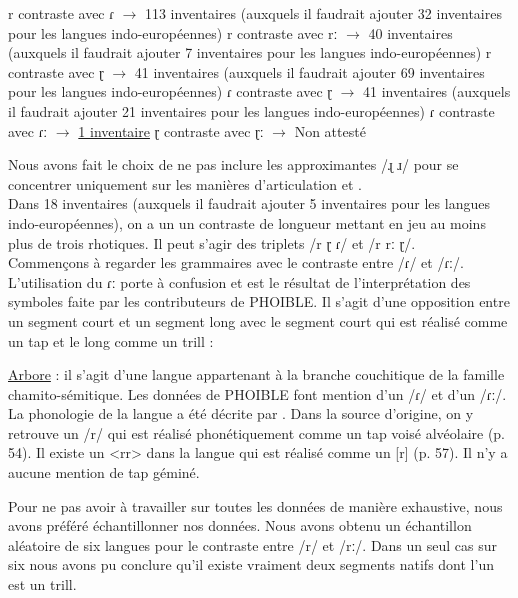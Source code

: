 \begin{exe}
	\ex \begin{xlist}
	\ex r contraste avec ɾ $\to$ 113 inventaires (auxquels il faudrait ajouter 32 inventaires pour les langues indo-européennes)
	\ex r contraste avec rː $\to$ 40 inventaires (auxquels il faudrait ajouter 7 inventaires pour les langues indo-européennes)
	\ex r contraste avec ɽ $\to$ 41 inventaires (auxquels il faudrait ajouter 69 inventaires pour les langues indo-européennes)
	\ex ɾ contraste avec ɽ $\to$ 41 inventaires (auxquels il faudrait ajouter 21 inventaires pour les langues indo-européennes)
	\ex ɾ contraste avec ɾː $\to$ \href{https://phoible.org/inventories/view/1525}{1 inventaire}
	\ex ɽ contraste avec ɽː $\to$ Non attesté
		\end{xlist}
\end{exe}

Nous avons fait le choix de ne pas inclure les approximantes /ɻ ɹ/ pour se concentrer uniquement sur les manières d'articulation  et .\\

Dans 18 inventaires (auxquels il faudrait ajouter 5 inventaires pour les langues indo-européennes), on a un un contraste de longueur mettant en jeu au moins plus de trois rhotiques. Il peut s'agir des triplets /r ɽ ɾ/ et /r  rː ɽ/.\\

Commençons à regarder les grammaires avec le contraste entre /ɾ/ et /ɾː/. L'utilisation du ɾː porte à confusion et est le résultat de l'interprétation des symboles faite par les contributeurs de PHOIBLE. Il s'agit d'une opposition entre un segment court et un segment long avec le segment court qui est réalisé comme un tap et le long comme un trill :

\begin{exe}
	\ex \href{https://phoible.org/inventories/view/1525}{Arbore}  : il s'agit d'une langue appartenant à la branche couchitique de la famille chamito-sémitique. Les données de PHOIBLE font mention d'un /ɾ/ et d'un /ɾː/. La phonologie de la langue a été décrite par \textcite{haywardArboreLanguageFirst1984}. Dans la source d'origine, on y retrouve un /r/ qui est réalisé phonétiquement comme un tap voisé alvéolaire (p. 54). Il existe un <rr> dans la langue qui est réalisé comme un [r] (p. 57). Il n'y a aucune mention de tap géminé.
\end{exe}

Pour ne pas avoir à travailler sur toutes les données de manière exhaustive, nous avons préféré échantillonner nos données. Nous avons obtenu un échantillon aléatoire de six langues pour le contraste entre /r/ et /rː/. Dans un seul cas sur six nous avons pu conclure qu'il existe vraiment deux segments natifs dont l'un est un trill. 

